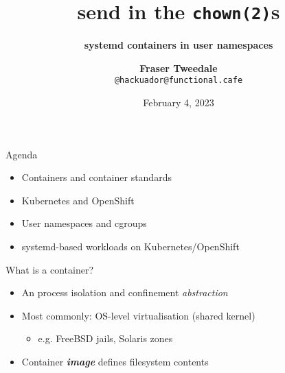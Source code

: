 \documentclass[ignorenonframetext,aspectratio=169,12pt]{beamer}
\title{\bf send in the {\tt chown(2)}s}
\subtitle{\bf systemd containers in user namespaces}
\author{{\bf Fraser Tweedale}\\
    \texttt{@hackuador@functional.cafe}\\
    \bigskip
    \medskip
    \def\svgwidth{4cm}
    }
\date{February 4, 2023}
\begin{document}
\frame{\titlepage}

\begin{frame}{Agenda}
\protect\hypertarget{agenda}{}

\begin{itemize}
    \item Containers and container standards
    \item Kubernetes and OpenShift
    \item User namespaces and cgroups
    \item systemd-based workloads on Kubernetes/OpenShift
\end{itemize}

\end{frame}


\begin{frame}{What is a container?}
\protect\hypertarget{container-definition}{}

\begin{itemize}
    \item An process isolation and confinement {\em abstraction}
    \item Most commonly: OS-level virtualisation (shared kernel)
        \begin{itemize}
        \item e.g. FreeBSD jails, Solaris zones
        \end{itemize}
    \item Container \emph{\textbf{image}} defines filesystem contents
\end{itemize}

\end{frame}
\end{document}
